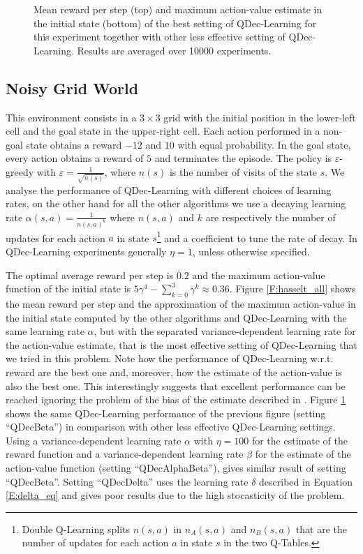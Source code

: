 \documentclass[conference]{IEEEtran}
\begin{document}
\begin{figure}[t]
\begin{minipage}{\columnwidth}
\end{minipage}
  \caption{Mean reward per step (top) and maximum action-value estimate in the initial state (bottom) of the best setting of QDec-Learning for this experiment together with other less effective setting of QDec-Learning. Results are averaged over 10000 experiments.}
  \label{F:hasselt_QDecs}
\end{figure}

\subsection{Noisy Grid World}
This environment consists in a $3 \times 3$ grid with the initial position in the lower-left cell and the goal state in the upper-right cell. Each action performed in a non-goal state obtains a reward $-12$ and $10$ with equal probability. In the goal state, every action obtains a reward of $5$ and terminates the episode. The policy is $\varepsilon$-greedy with $\varepsilon = \frac{1}{\sqrt{n(s)}}$, where $n(s)$ is the number of  visits of the state $s$. We analyse the performance of QDec-Learning with different choices of learning rates, on the other hand for all the other algorithms we use a decaying learning rate $\alpha(s, a) = \frac{1}{n(s, a)^{k}}$ where $n(s, a)$ and $k$ are respectively the number of updates for each action $a$ in state $s$\footnote{Double Q-Learning splits $n(s,a)$ in $n_A(s,a)$ and $n_B(s,a)$ that are the number of updates for each action $a$ in state $s$ in the two Q-Tables.} and a coefficient to tune the rate of decay. In QDec-Learning experiments generally $\eta = 1$, unless otherwise specified.

The optimal average reward per step is $0.2$ and the maximum action-value function of the initial state is $5\gamma^4 - \sum_{k=0}^3 \gamma^k \approx 0.36$. Figure \ref{F:hasselt_all} shows the mean reward per step and the approximation of the maximum action-value in the initial state computed by the other algorithms and QDec-Learning with the same learning rate $\alpha$, but with the separated variance-dependent learning rate for the action-value estimate, that is the most effective setting of QDec-Learning that we tried in this problem. Note how the performance of QDec-Learning w.r.t. reward are the best one and, moreover, how the estimate of the action-value is also the best one. This interestingly suggests that excellent performance can be reached ignoring the problem of the bias of the estimate described in \cite{van2010double}. Figure \ref{F:hasselt_QDecs} shows the same QDec-Learning performance of the previous figure (setting ``QDecBeta'') in comparison with other less effective QDec-Learning settings. Using a variance-dependent learning rate $\alpha$ with $\eta = 100$ for the estimate of the reward function and a variance-dependent learning rate $\beta$ for the estimate of the action-value function (setting ``QDecAlphaBeta''), gives similar result of setting ``QDecBeta''. Setting ``QDecDelta'' uses the learning rate $\delta$ described in Equation \ref{E:delta_eq} and gives poor results due to the high stocasticity of the problem.
\end{document}
